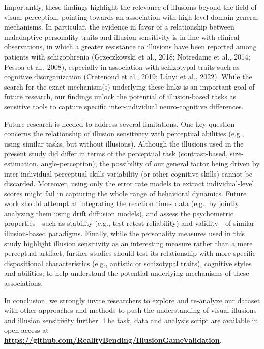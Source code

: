 \documentclass[
  man,floatsintext]{apa6}
\begin{document}
Importantly, these findings highlight the relevance of illusions beyond the field of visual perception, pointing towards an association with high-level domain-general mechanisms. In particular, the evidence in favor of a relationship between maladaptive personality traits and illusion sensitivity is in line with clinical observations, in which a greater resistance to illusions have been reported among patients with schizophrenia (Grzeczkowski et al., 2018; Notredame et al., 2014; Pessoa et al., 2008), especially in association with schizotypal traits such as cognitive disorganization (Cretenoud et al., 2019; Lányi et al., 2022). While the search for the exact mechanism(s) underlying these links is an important goal of future research, our findings unlock the potential of illusion-based tasks as sensitive tools to capture specific inter-individual neuro-cognitive differences.

Future research is needed to address several limitations. One key question concerns the relationship of illusion sensitivity with perceptual abilities (e.g., using similar tasks, but without illusions). Although the illusions used in the present study did differ in terms of the perceptual task (contrast-based, size-estimation, angle-perception), the possibility of our general factor being driven by inter-individual perceptual skills variability (or other cognitive skills) cannot be discarded. Moreover, using only the error rate models to extract individual-level scores might fail in capturing the whole range of behavioral dynamics. Future work should attempt at integrating the reaction times data (e.g., by jointly analyzing them using drift diffusion models), and assess the psychometric properties - such as stability (e.g., test-retest reliability) and validity - of similar illusion-based paradigms. Finally, while the personality measures used in this study highlight illusion sensitivity as an interesting measure rather than a mere perceptual artifact, further studies should test its relationship with more specific dispositional characteristics (e.g., autistic or schizotypal traits), cognitive styles and abilities, to help understand the potential underlying mechanisms of these associations.

In conclusion, we strongly invite researchers to explore and re-analyze our dataset with other approaches and methods to push the understanding of visual illusions and illusion sensitivity further. The task, data and analysis script are available in open-access at \href{https://github.com/RealityBending/IllusionGameValidation}{\textbf{https://github.com/RealityBending/IllusionGameValidation}}.
\end{document}
